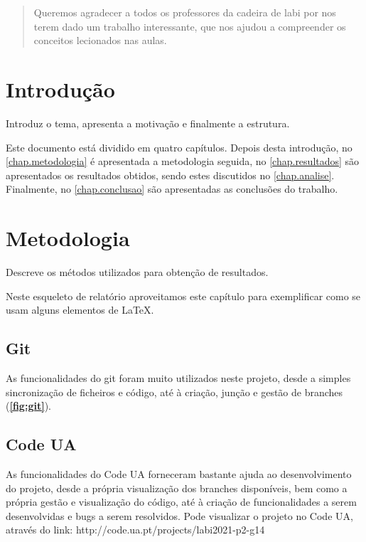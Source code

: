 \documentclass{report}
\begin{document}
\renewcommand{\abstractname}{Agradecimentos}
\begin{abstract}
Queremos agradecer a todos os professores da cadeira de \ac{labi} por nos terem
dado um trabalho interessante, que nos ajudou a compreender os conceitos
lecionados nas aulas.
\end{abstract}


\tableofcontents


\clearpage
{}

\chapter{Introdução}
\label{chap.introducao}

Introduz o tema, apresenta a motivação e finalmente a estrutura.

Este documento está dividido em quatro capítulos.
Depois desta introdução,
no \autoref{chap.metodologia} é apresentada a metodologia seguida,
no \autoref{chap.resultados} são apresentados os resultados obtidos,
sendo estes discutidos no \autoref{chap.analise}.
Finalmente, no \autoref{chap.conclusao} são apresentadas
as conclusões do trabalho.

\chapter{Metodologia}
\label{chap.metodologia}
Descreve os métodos utilizados para obtenção de resultados.

Neste esqueleto de relatório aproveitamos este capítulo para exemplificar
como se usam alguns elementos de {\LaTeX}.

\section{Git}
\label{sec:git}
As funcionalidades do git foram muito utilizados neste projeto, desde a simples sincronização 
de ficheiros e código, até à criação, junção e gestão de branches (\textbf{\autoref{fig:git}}). 
\cite{git}

\section{Code UA}
\label{sec:codeua}
As funcionalidades do Code UA forneceram bastante ajuda ao desenvolvimento do projeto, 
desde a própria visualização dos branches disponíveis, bem como a própria gestão e 
visualização do código, até à criação de funcionalidades a serem desenvolvidas e bugs 
a serem resolvidos. Pode visualizar o projeto no Code UA, através do 
link: http://code.ua.pt/projects/labi2021-p2-g14
\cite{codeua}
\end{document}
